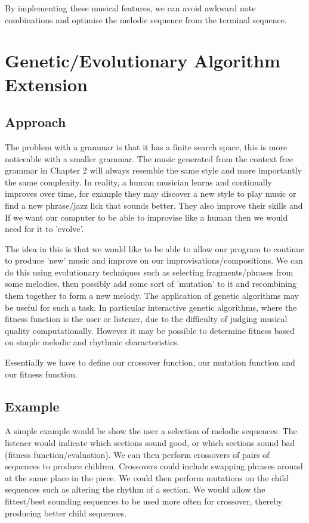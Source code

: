 \documentclass[pdftex,12pt,a4paper]{report}
\begin{document}
By implementing these musical features, we can avoid awkward note combinations and optimise the melodic sequence from the terminal sequence.


\chapter{Genetic/Evolutionary Algorithm Extension}

\section{Approach}
The problem with a grammar is that it has a finite search space, this is more noticeable with a smaller grammar. The music generated from the context free grammar in Chapter 2 will always resemble the same style and more importantly the same complexity. In reality, a human musician learns and continually improves over time, for example they may discover a new style to play music or find a new phrase/jazz lick that sounds better. They also improve their skills and  If we want our computer to be able to improvise like a human then we would need for it to 'evolve'.

The idea in this is that we would like to be able to allow our program to continue to produce 'new' music and improve on our improvisations/compositions. We can do this using evolutionary techniques such as selecting fragments/phrases from some melodies, then possibly add some sort of 'mutation' to it and recombining them together to form a new melody. The application of genetic algorithms may be useful for such a task. In particular interactive genetic algorithms, where the fitness function is the user or listener, due to the difficulty of judging musical quality computationally. However it may be possible to determine fitness based on simple melodic and rhythmic characteristics. 

Essentially we have to define our crossover function, our mutation function and our fitness function.

\section{Example}
A simple example would be show the user a selection of melodic sequences. The listener would indicate which sections sound good, or which sections sound bad (fitness function/evaluation). We can then perform crossovers of pairs of sequences to produce children. Crossovers could include swapping phrases around at the same place in the piece. We could then perform mutations on the child sequences such as altering the rhythm of a section. We would allow the fittest/best sounding sequences to be used more often for crossover, thereby producing better child sequences.
\end{document}

